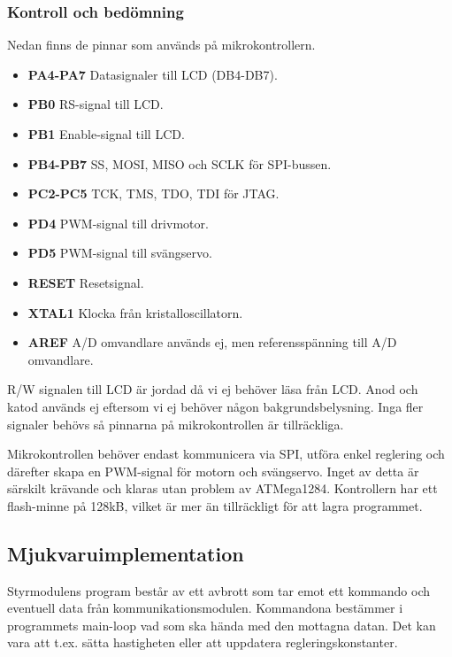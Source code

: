 \documentclass[tekniskrapport/tech.tex]{subfiles}
\begin{document}
\subsubsection{Kontroll och bedömning}
Nedan finns de pinnar som används på mikrokontrollern.
\begin{itemize}
   \item \textbf{PA4-PA7} Datasignaler till LCD (DB4-DB7).
   \item \textbf{PB0} RS-signal till LCD.
   \item \textbf{PB1} Enable-signal till LCD.
   \item \textbf{PB4-PB7} SS, MOSI, MISO och SCLK för SPI-bussen.
   \item \textbf{PC2-PC5} TCK, TMS, TDO, TDI för JTAG.
   \item \textbf{PD4} PWM-signal till drivmotor.
   \item \textbf{PD5} PWM-signal till svängservo.
   \item \textbf{RESET} Resetsignal.
   \item \textbf{XTAL1} Klocka från kristalloscillatorn.
   \item \textbf{AREF} A/D omvandlare används ej, men referensspänning till A/D omvandlare.
\end{itemize}
R/W signalen till LCD är jordad då vi ej behöver läsa från LCD. Anod
och katod används ej eftersom vi ej behöver någon bakgrundsbelysning. Inga
fler signaler behövs så pinnarna på mikrokontrollen är tillräckliga.

Mikrokontrollen behöver endast kommunicera via SPI, utföra enkel reglering och
därefter skapa en PWM-signal för motorn och svängservo. Inget av detta är
särskilt krävande och klaras utan problem av ATMega1284. Kontrollern har
ett flash-minne på 128kB, vilket är mer än tillräckligt för att lagra
programmet.

\subsection{Mjukvaruimplementation} Styrmodulens program består av ett 
avbrott som tar emot ett kommando och eventuell data från
kommunikationsmodulen. Kommandona bestämmer i programmets main-loop vad som
ska hända med den mottagna datan. Det kan vara att t.ex. sätta hastigheten
eller att uppdatera regleringskonstanter. 
\end{document}
